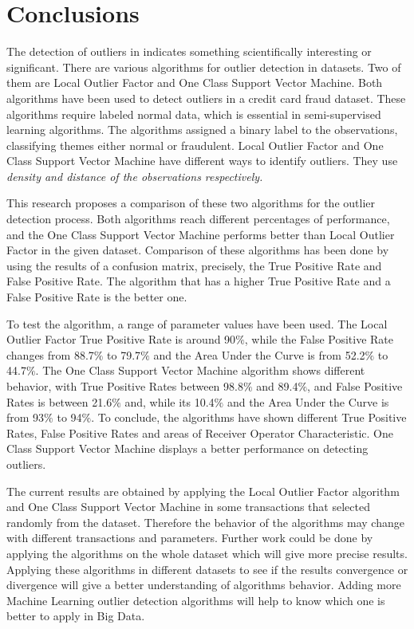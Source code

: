 \chapter{Conclusions} \label{Conclusion}
The detection of outliers in indicates something scientifically interesting or significant. There are various algorithms for outlier detection in datasets. Two of them are Local Outlier Factor and One Class Support Vector Machine. Both algorithms have been used to detect outliers in a credit card fraud dataset. These algorithms require labeled normal data, which is essential in semi-supervised learning algorithms. The algorithms assigned a binary label to the observations, classifying themes either normal or fraudulent. Local Outlier Factor and One Class Support Vector Machine have different ways to identify outliers. They use \em{density} and \em{distance} of the observations respectively.

This research proposes a comparison of these two algorithms for the outlier detection process. Both algorithms reach different percentages of performance, and the One Class Support Vector Machine performs better than Local Outlier Factor in the given dataset. Comparison of these algorithms has been done by using the results of a confusion matrix, precisely, the True Positive Rate and False Positive Rate. The algorithm that has a higher True Positive Rate and a False Positive Rate is the better one.

To test the algorithm, a range of parameter values have been used. The Local Outlier Factor True Positive Rate is around 90$\%$, while the False Positive Rate changes from 88.7$\%$ to 79.7$\%$ and the Area Under the Curve is from 52.2$\%$ to 44.7$\%$. The One Class Support Vector Machine algorithm shows different behavior, with True Positive Rates between 98.8$\%$ and 89.4$\%$, and False Positive Rates is between 21.6$\%$ and, while its 10.4$\%$ and the Area Under the Curve is from 93$\%$ to 94$\%$. To conclude, the algorithms have shown different True Positive Rates, False Positive Rates and areas of Receiver Operator Characteristic. One Class Support Vector Machine displays a better performance on detecting outliers.

The current results are obtained by applying the Local Outlier Factor algorithm and One Class Support Vector Machine in some transactions that selected randomly from the dataset. Therefore the behavior of the algorithms may change with different transactions and parameters. Further work could be done by applying the algorithms on the whole dataset which will give more precise results. Applying these algorithms in different datasets to see if the results convergence or divergence will give a better understanding of algorithms behavior. Adding more Machine Learning outlier detection algorithms will help to know which one is better to apply in Big Data.